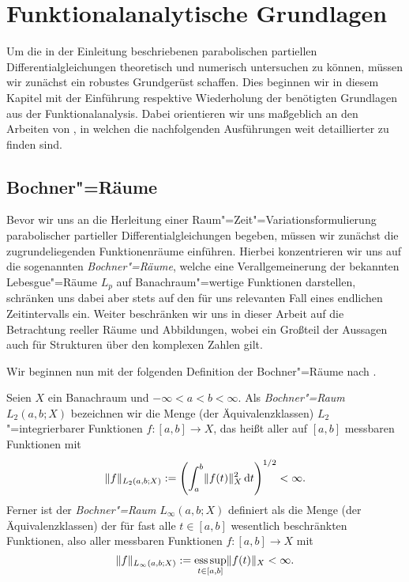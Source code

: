 \documentclass[../main.tex]{subfiles}
\begin{document}
\chapter{Funktionalanalytische Grundlagen} %
\label{chapter:grundlagen}

Um die in der Einleitung beschriebenen parabolischen partiellen Differentialgleichungen theoretisch und numerisch untersuchen zu können, müssen wir zunächst ein robustes Grundgerüst schaffen.
Dies beginnen wir in diesem Kapitel mit der Einführung respektive Wiederholung der benötigten Grundlagen aus der Funktionalanalysis.
Dabei orientieren wir uns maßgeblich an den Arbeiten von \textcite{Dautray:1992by,Schweizer2013}, in welchen die nachfolgenden Ausführungen weit detaillierter zu finden sind.


\section{Bochner"=Räume} %
\label{section:bochner_raeume}

Bevor wir uns an die Herleitung einer Raum"=Zeit"=Variationsformulierung parabolischer partieller Differentialgleichungen begeben, müssen wir zunächst die zugrundeliegenden Funktionenräume einführen.
Hierbei konzentrieren wir uns auf die sogenannten \emph{Bochner"=Räume}, welche eine Verallgemeinerung der bekannten Lebesgue"=Räume $L_{p}$ auf Banachraum"=wertige Funktionen darstellen, schränken uns dabei aber stets auf den für uns relevanten Fall eines endlichen Zeitintervalls ein.
Weiter beschränken wir uns in dieser Arbeit auf die Betrachtung reeller Räume und Abbildungen, wobei ein Großteil der Aussagen auch für Strukturen über den komplexen Zahlen gilt.

Wir beginnen nun mit der folgenden Definition der Bochner"=Räume nach \cite[Definition XVIII.1.1]{Dautray:1992by}.

\begin{Definition}
\label{definition:bochner_raum}
    Seien $X$ ein Banachraum und $- \infty < a < b < \infty$.
    Als \emph{Bochner"=Raum} $L_{2}(a, b; X)$ bezeichnen wir die Menge (der Äquivalenzklassen) $L_{2}$"=integrierbarer Funktionen $f \colon [a, b] \to X$, das heißt aller auf $[a, b]$ messbaren Funktionen mit
    \begin{equation}
        \lVert f\rVert_{L_{2}(a, b; X)} := \left( \int_{a}^{b} \lVert f(t)\rVert_{X}^{2} \mathop{}\!\mathrm{d} t \right)^{1 / 2} < \infty.
    \end{equation}
    Ferner ist der \emph{Bochner"=Raum} $L_{\infty}(a, b; X)$ definiert als die Menge (der Äquivalenzklassen) der für fast alle $t \in [a, b]$ wesentlich beschränkten Funktionen, also aller messbaren Funktionen $f \colon [a, b] \to X$ mit
    \begin{equation}
        \lVert f\rVert_{L_{\infty}(a, b; X)} := \operatorname*{ess\,sup}_{t \in [a, b]} \lVert f(t)\rVert_{X} < \infty.
    \end{equation}
\end{Definition}
\end{document}
